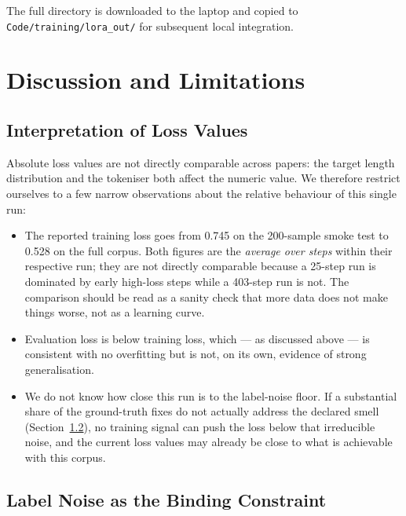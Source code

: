 \documentclass[12pt, a4paper]{report}
\begin{document}
The full directory is downloaded to the laptop and copied to
\texttt{Code/training/lora\_out/} for subsequent local integration.

\chapter{Discussion and Limitations}
\label{ch:discussion}

\section{Interpretation of Loss Values}

Absolute loss values are not directly comparable across papers: the
target length distribution and the tokeniser both affect the numeric
value. We therefore restrict ourselves to a few narrow observations
about the relative behaviour of this single run:

\begin{itemize}
  \item The reported training loss goes from 0.745 on the 200-sample
        smoke test to 0.528 on the full corpus. Both figures are the
        \emph{average over steps} within their respective run; they are
        not directly comparable because a 25-step run is dominated by
        early high-loss steps while a 403-step run is not. The
        comparison should be read as a sanity check that more data does
        not make things worse, not as a learning curve.
  \item Evaluation loss is below training loss, which --- as discussed
        above --- is consistent with no overfitting but is not, on its
        own, evidence of strong generalisation.
  \item We do not know how close this run is to the label-noise floor.
        If a substantial share of the ground-truth fixes do not
        actually address the declared smell (Section~\ref{sec:label-noise}),
        no training signal can push the loss below that irreducible
        noise, and the current loss values may already be close to what
        is achievable with this corpus.
\end{itemize}

\section{Label Noise as the Binding Constraint}
\label{sec:label-noise}
\end{document}
